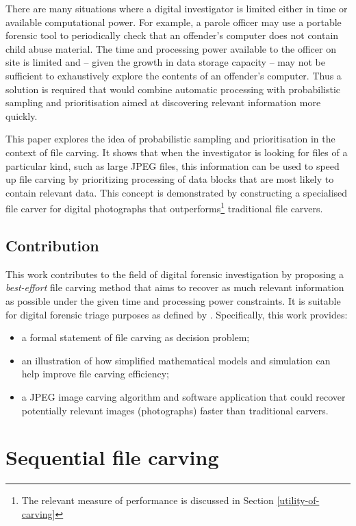 \documentclass[final,5p,times,twocolumn,authoryear]{elsarticle}
\begin{document}
There are many situations where a digital investigator is limited either in time or available computational power. For example, a parole officer may use a portable forensic tool to periodically check that an offender's computer does not contain child abuse material. The time and processing power available to the officer on site is limited and -- given the growth in data storage capacity -- may not be sufficient to exhaustively explore the contents of an offender's computer. Thus a solution is required that would combine automatic processing with probabilistic sampling and prioritisation aimed at discovering relevant information more quickly.

This paper explores the idea of probabilistic sampling and prioritisation in the context of file carving. It shows that when the investigator is looking for files of a particular kind, such as large JPEG files, this information can be used to speed up file carving by prioritizing processing of data blocks that are most likely to contain relevant data. This concept is demonstrated by constructing a specialised file carver for digital photographs that outperforms\footnote{The relevant measure of performance is discussed in Section \ref{utility-of-carving}} traditional file carvers.

\subsection{Contribution}
This work contributes to the field of digital forensic investigation by proposing a \emph{best-effort} file carving method that aims to recover as much relevant information as possible under the given time and processing power constraints. It is suitable for digital forensic triage purposes as defined by \citep{Koopmans2013}. Specifically, this work provides:
\begin{itemize}
	\item{a formal statement of file carving as decision problem;}
	\item{an illustration of how simplified mathematical models and simulation can help improve file carving efficiency;}
	\item{a JPEG image carving algorithm and software application that could recover potentially relevant images (photographs) faster than traditional carvers.}
\end{itemize}

\section{Sequential file carving}
\end{document}
